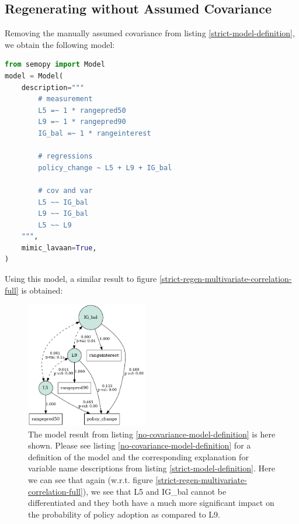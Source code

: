 \documentclass[]{article}
\begin{document}
\subsection{Regenerating without Assumed Covariance}
Removing the manually assumed covariance from listing \ref{strict-model-definition}, we obtain the following model:
\begin{lstlisting}[language=python,label=no-covariance-model-definition,caption={SEM model without assumed covariance between rangepred50 and rangepred90}]
from semopy import Model
model = Model(
	description="""
		# measurement
		L5 =~ 1 * rangepred50
		L9 =~ 1 * rangepred90
		IG_bal =~ 1 * rangeinterest
		
		# regressions
		policy_change ~ L5 + L9 + IG_bal
		
		# cov and var
		L5 ~~ IG_bal
		L9 ~~ IG_bal
		L5 ~~ L9
	""",
	mimic_lavaan=True,
)	
\end{lstlisting}
Using this model, a similar result to figure \ref{strict-regen-multivariate-correlation-full} is obtained:
\begin{figure}[H]
	\begin{center}
		\includegraphics[width=200px]{./figures/generated/multivariate-analysis/no-assumed-covariance-multivariate-correlation-full.png}
	\end{center}
	\caption{The model result from listing \ref{no-covariance-model-definition} is here shown. Please see listing \ref{no-covariance-model-definition} for a definition of the model and the corresponding explanation for variable name descriptions from listing \ref{strict-model-definition}. Here we can see that again (w.r.t. figure \ref{strict-regen-multivariate-correlation-full}), we see that L5 and IG\_bal cannot be differentiated and they both have a much more significant impact on the probability of policy adoption as compared to L9.}
	\label{no-covariance-regen-multivariate-correlation-full}
\end{figure}
\end{document}
